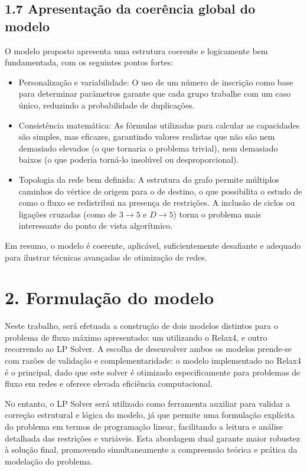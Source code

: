 \documentclass[a4paper,12pt]{article}
\begin{document}
\subsection*{1.7 Apresentação da coerência global do modelo}
O modelo proposto apresenta uma estrutura coerente e logicamente bem fundamentada, com os seguintes pontos fortes:
\begin{itemize}
    \item Personalização e variabilidade: O uso de um número de inscrição como base para determinar parâmetros garante que cada grupo trabalhe com um caso único, reduzindo a probabilidade de duplicações.
    \item Consistência matemática: As fórmulas utilizadas para calcular as capacidades são simples, mas eficazes, garantindo valores realistas que não são nem demasiado elevados (o que tornaria o problema trivial), nem demasiado baixos (o que poderia torná-lo insolúvel ou desproporcional).
    \item Topologia da rede bem definida: A estrutura do grafo permite múltiplos caminhos do vértice de origem para o de destino, o que possibilita o estudo de como o fluxo se redistribui na presença de restrições. A inclusão de ciclos ou ligações cruzadas (como de $3 \rightarrow 5$ e $D \rightarrow 5$) torna o problema mais interessante do ponto de vista algorítmico.
\end{itemize}
Em resumo, o modelo é coerente, aplicável, suficientemente desafiante e adequado para ilustrar técnicas avançadas de otimização de redes.

\section*{2. Formulação do modelo}
Neste trabalho, será efetuada a construção de dois modelos distintos para o problema de fluxo máximo apresentado: um utilizando o Relax4, e outro recorrendo ao LP Solver. A escolha de desenvolver ambos os modelos prende-se com razões de validação e complementaridade: o modelo implementado no Relax4 é o principal, dado que este solver é otimizado especificamente para problemas de fluxo em redes e oferece elevada eficiência computacional.

\vspace{0.5em}

No entanto, o LP Solver será utilizado como ferramenta auxiliar para validar a correção estrutural e lógica do modelo, já que permite uma formulação explícita do problema em termos de programação linear, facilitando a leitura e análise detalhada das restrições e variáveis. Esta abordagem dual garante maior robustez à solução final, promovendo simultaneamente a compreensão teórica e prática da modelação do problema.
\end{document}
